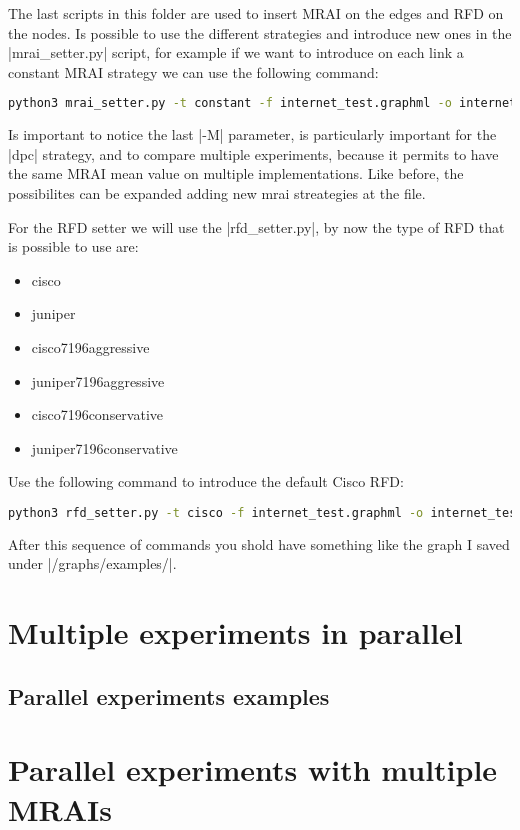 \documentclass[10pt,journal,onecolumn]{IEEEtran}
\begin{document}
The last scripts in this folder are used to insert \ac{MRAI} on the edges
and \ac{RFD} on the nodes.
Is possible to use the different strategies and introduce new ones
in the |mrai_setter.py| script, for example if we want to introduce
on each link a constant \ac{MRAI} strategy we can use the following command:
\begin{lstlisting}[language=bash]
python3 mrai_setter.py -t constant -f internet_test.graphml -o internet_test.graphml -m 30 -M 30
\end{lstlisting}
Is important to notice the last |-M| parameter, is particularly important for 
the |dpc| strategy, and to compare multiple experiments, because it permits to
have the same MRAI mean value on multiple implementations.
Like before, the possibilites can be expanded adding new mrai streategies at the file.

For the \ac{RFD} setter we will use the |rfd_setter.py|, by now the type of \ac{RFD}
that is possible to use are:
\begin{itemize}
	\item cisco
	\item juniper
	\item cisco7196aggressive
	\item juniper7196aggressive
	\item cisco7196conservative
	\item juniper7196conservative
\end{itemize}
Use the following command to introduce the default Cisco \ac{RFD}:
\begin{lstlisting}[language=bash]
python3 rfd_setter.py -t cisco -f internet_test.graphml -o internet_test.graphml
\end{lstlisting}

After this sequence of commands you shold have something like the graph
I saved under |/graphs/examples/|.

\section{Multiple experiments in parallel}
\label{sec:multiple_experiments}

\subsection{Parallel experiments examples}
\label{subsec:parallel_examples}

\section{Parallel experiments with multiple MRAIs}
\label{sec:parallel_mrais}
\end{document}
